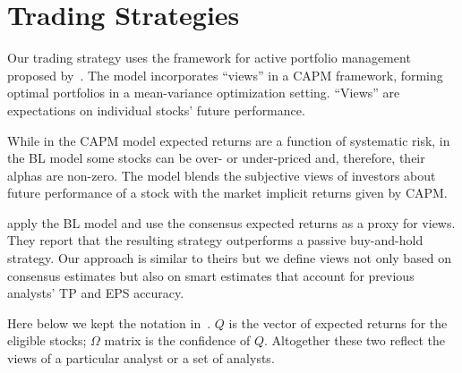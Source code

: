 \documentclass[a4paper,12pt,openright,notitlepage]{report}\usepackage[]{graphicx}\usepackage[]{color}
\begin{document}




\section{Trading Strategies}
\label{ch1-sec:trading}
Our trading strategy uses the framework for  active portfolio management proposed by~\cite{black1992}.  The model incorporates ``views'' in a CAPM framework, forming optimal portfolios in a mean-variance optimization setting. ``Views'' are expectations on individual stocks' future performance.

While in the CAPM model expected returns are a function of systematic risk, in the BL model some stocks can be over- or under-priced and, therefore, their alphas are non-zero. The model blends the subjective views of investors about future performance of a stock with the market implicit returns given by CAPM.

\cite{da2011bl} apply the BL model and use the consensus expected returns as a proxy for views. They report that the resulting strategy outperforms a passive buy-and-hold strategy. Our approach is similar to theirs but we define views not only based on consensus estimates but also on smart estimates that account for previous analysts' TP and EPS accuracy.

Here below we kept the notation in~\cite{black1992}.  $Q$ is the vector of  expected returns for the eligible stocks; $\Omega$ matrix is the confidence of $Q$. Altogether these two reflect the views of a particular analyst or a set of analysts.
\end{document}
